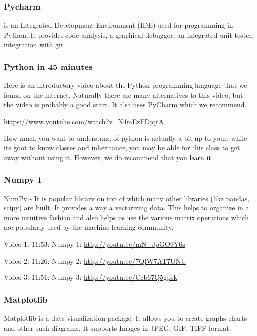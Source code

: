 \subsubsection{Pycharm}\label{pycharm}

is an Integrated Development Environment (IDE) used for programming in
Python. It provides code analysis, a graphical debugger, an integrated
unit tester, integration with git.


\subsubsection{Python in 45 minutes}\label{python-in-45-minutes}

Here is an introductory video about the Python programming language that
we found on the internet. Naturally there are many alternatives to this
video, but the video is probably a good start. It also uses PyCharm
which we recommend.

\url{https://www.youtube.com/watch?v=N4mEzFDjqtA}

How much you want to understand of python is actually a bit up to your,
while its goot to know classes and inheritance, you may be able for this
class to get away without using it. However, we do recommend that you
learn it.

\subsubsection{Numpy 1}\label{numpy-1}

NumPy - It is popular library on top of which many other libraries (like
pandas, scipy) are built. It provides a way a vectorizing data. This
helps to organize in a more intuitive fashion and also helps us use the
various matrix operations which are popularly used by the machine
learning community.

Video 1: 11:53: Numpy 1: \url{http://youtu.be/mN_JpGO9Y6s}

Video 2: 11:26: Numpy 2: \url{http://youtu.be/7QfW7AT7UNU}

Video 3: 11:51: Numpy 3: \url{http://youtu.be/Ccb67Q5gpsk}

\subsubsection{Matplotlib}\label{matplotlib}

Matplotlib is a data visualization package. It allows you to create
graphs charts and other such diagrams. It supports Images in JPEG, GIF,
TIFF format.

